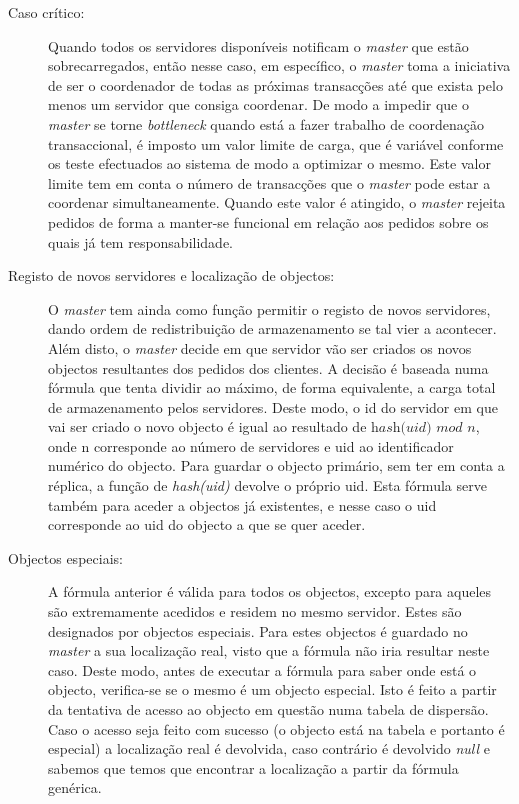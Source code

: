 \begin{description}
\item[Caso crítico:]
Quando todos os servidores disponíveis notificam o \textit{master} que estão sobrecarregados, então nesse caso, em específico, o \textit{master} toma a iniciativa de ser o coordenador de todas as próximas transacções até que exista pelo menos um servidor que consiga coordenar. De modo a impedir que o \textit{master} se torne \textit{bottleneck} quando está a fazer trabalho de coordenação transaccional, é imposto um valor limite de carga, que é variável conforme os teste efectuados ao sistema de modo a optimizar o mesmo. Este valor limite tem em conta o número de transacções que o \textit{master} pode estar a coordenar simultaneamente. Quando este valor é atingido, o \textit{master} rejeita pedidos de forma a manter-se funcional em relação aos pedidos sobre os quais já tem responsabilidade. 

\item[Registo de novos servidores e localização de objectos:]
O \textit{master} tem ainda como função permitir o registo de novos servidores, dando ordem de redistribuição de armazenamento se tal vier a acontecer. Além disto, o \textit{master} decide em que servidor vão ser criados os novos objectos resultantes dos pedidos dos clientes. A decisão é baseada numa fórmula que tenta dividir ao máximo, de forma equivalente, a carga total de armazenamento pelos servidores. Deste modo, o id do servidor em que vai ser criado o novo objecto é igual ao resultado de $ \textit{hash(uid) mod n} $, onde n corresponde ao número de servidores e uid ao identificador numérico do objecto. Para guardar o objecto primário, sem ter em conta a réplica, a função de \textit{hash(uid)} devolve o próprio uid. Esta fórmula serve também para aceder a objectos já existentes, e nesse caso o uid corresponde ao uid do objecto a que se quer aceder.

\item[Objectos especiais:]
A fórmula anterior é válida para todos os objectos, excepto para aqueles são extremamente acedidos e residem no mesmo servidor. Estes são designados por objectos especiais. Para estes objectos é guardado no \textit{master} a sua localização real, visto que a fórmula não iria resultar neste caso. Deste modo, antes de executar a fórmula para saber onde está o objecto, verifica-se se o mesmo é um objecto especial. Isto é feito a partir da tentativa de acesso ao objecto em questão numa tabela de dispersão. Caso o acesso seja feito com sucesso (o objecto está na tabela e portanto é especial) a localização real é devolvida, caso contrário é devolvido \textit{null} e sabemos que temos que encontrar a localização a partir da fórmula genérica.


\end{description}
